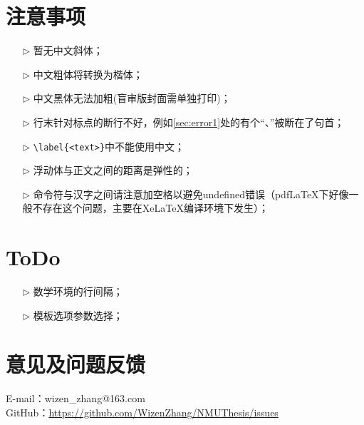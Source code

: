 \section{注意事项}
\begin{itemize}
  \item[$\triangleright$] 暂无中文斜体；
  \item[$\triangleright$] 中文粗体将转换为楷体；
  \item[$\triangleright$] 中文黑体无法加粗(盲审版封面需单独打印)；
  \item[$\triangleright$] 行末针对标点的断行不好，例如\ref{sec:error1}处的有个“、”被断在了句首；
  \item[$\triangleright$] \verb|\label{<text>}|中不能使用中文；
  \item[$\triangleright$] 浮动体与正文之间的距离是弹性的；
  \item[$\triangleright$] 命令符与汉字之间请注意加空格以避免undefined错误（pdfLaTeX下好像一般不存在这个问题，主要在XeLaTeX编译环境下发生）；
\end{itemize}

\section{ToDo}
\begin{itemize}
  \item[$\triangleright$] 数学环境的行间隔；
  \item[$\triangleright$] 模板选项参数选择；
\end{itemize}

\section{意见及问题反馈}

\indent E-mail：wizen\_zhang@163.com\\
\indent GitHub：\href{https://github.com/WizenZhang/NMUThesis/issues}{https://github.com/WizenZhang/NMUThesis/issues}


